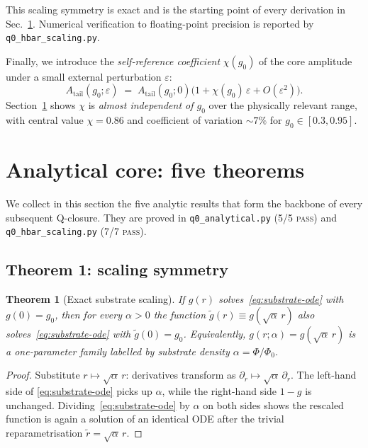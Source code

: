 \documentclass[11pt,a4paper]{article}
\renewcommand{\Phi}{\varPhi}
\newcommand{\PhiZero}{\varPhi_{0}}
\newcommand{\Atail}{A_{\mathrm{tail}}}
\newcommand{\chiTGP}{\chi}
\newcommand{\eps}{\varepsilon}
\newtheorem{theorem}{Theorem}
\begin{document}
This scaling symmetry is exact and is the starting point of every
derivation in Sec.~\ref{sec:analytical}. Numerical verification to
floating-point precision is reported by \verb|q0_hbar_scaling.py|.

Finally, we introduce the \emph{self-reference coefficient}
$\chiTGP(g_{0})$ of the core amplitude under a small external
perturbation $\eps$:
\begin{equation}\label{eq:chi-def}
  \Atail(g_{0};\eps) \;=\; \Atail(g_{0};0)\bigl(1+\chiTGP(g_{0})\,\eps
  +O(\eps^{2})\bigr).
\end{equation}
Section~\ref{sec:analytical} shows $\chiTGP$ is \emph{almost independent
of $g_{0}$} over the physically relevant range, with central value
$\chiTGP=0.86$ and coefficient of variation $\sim 7\%$ for
$g_{0}\in[0.3,0.95]$.

\section{Analytical core: five theorems}\label{sec:analytical}

We collect in this section the five analytic results that form the
backbone of every subsequent Q-closure. They are proved in
\verb|q0_analytical.py| (5/5 \textsc{pass}) and
\verb|q0_hbar_scaling.py| (7/7 \textsc{pass}).

\subsection{Theorem 1: scaling symmetry}

\begin{theorem}[Exact substrate scaling]\label{thm:scaling}
If $g(r)$ solves~\eqref{eq:substrate-ode} with $g(0)=g_{0}$, then for
every $\alpha>0$ the function $\tilde g(r)\equiv g(\sqrt{\alpha}\,r)$
also solves~\eqref{eq:substrate-ode} with $\tilde g(0)=g_{0}$.
Equivalently, $g(r;\alpha)=g(\sqrt{\alpha}\,r)$ is a one-parameter
family labelled by substrate density $\alpha=\Phi/\PhiZero$.
\end{theorem}

\begin{proof}
Substitute $r\mapsto\sqrt\alpha\,r$: derivatives transform as
$\partial_{r}\mapsto\sqrt\alpha\,\partial_{r}$. The left-hand side of
\eqref{eq:substrate-ode} picks up $\alpha$, while the right-hand side
$1-g$ is unchanged. Dividing~\eqref{eq:substrate-ode} by $\alpha$
on both sides shows the rescaled function is again a solution of an
identical ODE after the trivial reparametrisation $\tilde r=\sqrt\alpha\,r$.
\end{proof}
\end{document}
